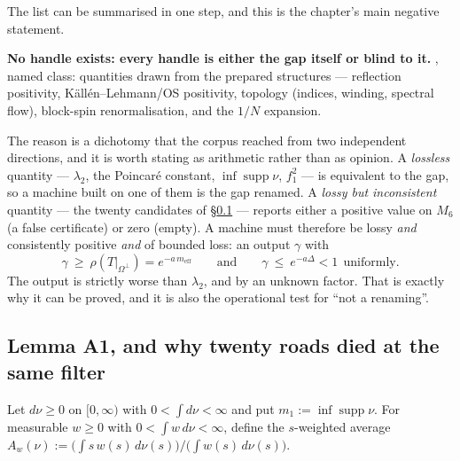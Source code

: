 The list can be summarised in one step, and this is the chapter's main negative statement.

\begin{qbox}
\textbf{No handle exists: every handle is either the gap itself or blind to it.} \LN, named class:
quantities drawn from the prepared structures --- reflection positivity, K\"all\'en--Lehmann/OS
positivity, topology (indices, winding, spectral flow), block-spin renormalisation, and the
$1/N$ expansion.
\end{qbox}

The reason is a dichotomy that the corpus reached from two independent directions, and it is worth
stating as arithmetic rather than as opinion. A \emph{lossless} quantity --- $\lambda_2$, the
Poincar\'e constant, $\inf\operatorname{supp}\nu$, $f_1^2$ --- is equivalent to the gap, so a machine
built on one of them is the gap renamed. A \emph{lossy but inconsistent} quantity --- the twenty
candidates of \S\ref{sec:ng-a1} --- reports either a positive value on $M_6$ (a false certificate) or
zero (empty). A machine must therefore be lossy \emph{and} consistently positive \emph{and} of bounded
loss: an output $\gamma$ with
\begin{equation}
\gamma\ \ge\ \rho(T|_{\Omega^\perp})=e^{-a\,m_{\mathrm{eff}}}
\qquad\text{and}\qquad
\gamma\ \le\ e^{-a\Delta}<1\ \ \text{uniformly}.
\label{eq:ng-lossy}
\end{equation}
The output is strictly worse than $\lambda_2$, and by an unknown factor. That is exactly why it can
be proved, and it is also the operational test for ``not a renaming''.

\subsection{Lemma A1, and why twenty roads died at the same filter}
\label{sec:ng-a1}

Let $d\nu\ge0$ on $[0,\infty)$ with $0<\int d\nu<\infty$ and put
$m_1:=\inf\operatorname{supp}\nu$. For measurable $w\ge0$ with $0<\int w\,d\nu<\infty$, define the
$s$-weighted average $A_w(\nu):=\big(\int s\,w(s)\,d\nu(s)\big)/\big(\int w(s)\,d\nu(s)\big)$.

